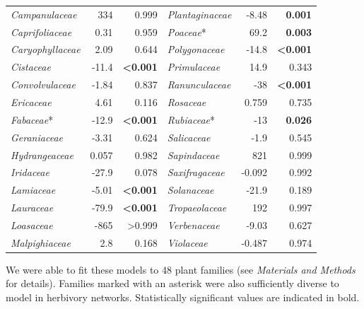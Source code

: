 \documentclass[12pt]{article}
\begin{document}
\begin{table}[!h]
\begin{tabular}{|l  rr|| l rr|}
    \emph{Campanulaceae}  & 334 & 0.999 & \emph{Plantaginaceae} & -8.48 & \textbf{0.001}  \\
    \emph{Caprifoliaceae} & 0.31  & 0.959 & \emph{Poaceae}* & 69.2  & \textbf{0.003}  \\
    \emph{Caryophyllaceae}  & 2.09  & 0.644 & \emph{Polygonaceae} & -14.8 & \textbf{\textless0.001} \\
    \emph{Cistaceae}  & -11.4 & \textbf{\textless0.001} & \emph{Primulaceae}  & 14.9  & 0.343 \\
    \emph{Convolvulaceae} & -1.84 & 0.837 & \emph{Ranunculaceae}  & -38 & \textbf{\textless0.001} \\
    \emph{Ericaceae}  & 4.61  & 0.116 & \emph{Rosaceae} & 0.759 & 0.735 \\
    \emph{Fabaceae}*  & -12.9 & \textbf{\textless0.001} & \emph{Rubiaceae}* & -13 & \textbf{0.026}  \\
    \emph{Geraniaceae}  & -3.31 & 0.624 & \emph{Salicaceae} & -1.9  & 0.545 \\
    \emph{Hydrangeaceae}  & 0.057 & 0.982 & \emph{Sapindaceae}  & 821 & 0.999 \\
    \emph{Iridaceae}  & -27.9 & 0.078 & \emph{Saxifragaceae}  & -0.092  & 0.992 \\
    \emph{Lamiaceae}  & -5.01 & \textbf{\textless0.001} & \emph{Solanaceae} & -21.9 & 0.189 \\
    \emph{Lauraceae}  & -79.9 & \textbf{\textless0.001} & \emph{Tropaeolaceae}  & 192 & 0.997 \\
    \emph{Loasaceae}  & -865  & \textgreater0.999 & \emph{Verbenaceae}  & -9.03 & 0.627 \\
    \emph{Malpighiaceae}  & 2.8 & 0.168 & \emph{Violaceae}  & -0.487  & 0.974 \\
  \hline
  \end{tabular}
  \smallskip
  \footnotesize

    We were able to fit these models to 48 plant families (see \emph{Materials and Methods} for details). 
    Families marked with an asterisk were also sufficiently diverse to model in herbivory networks. 
    Statistically significant values are indicated in bold. 

    \end{table}

\clearpage
\end{document}
